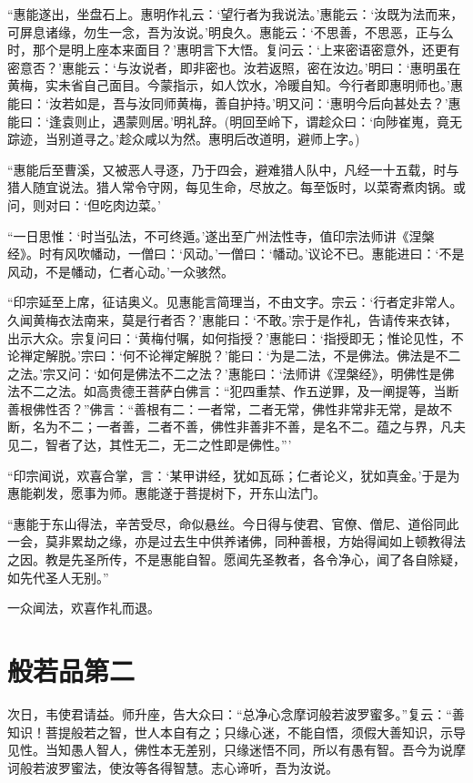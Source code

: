 \documentclass[UTF8, 11pt, oneside]{ctexart}
\begin{document}
“惠能遂出，坐盘石上。惠明作礼云：‘望行者为我说法。’惠能云：‘汝既为法而来，可屏息诸缘，勿生一念，吾为汝说。’明良久。惠能云：‘不思善，不思恶，正与么时，那个是明上座本来面目？’惠明言下大悟。复问云：‘上来密语密意外，还更有密意否？’惠能云：‘与汝说者，即非密也。汝若返照，密在汝边。’明曰：‘惠明虽在黄梅，实未省自己面目。今蒙指示，如人饮水，冷暖自知。今行者即惠明师也。’惠能曰：‘汝若如是，吾与汝同师黄梅，善自护持。’明又问：‘惠明今后向甚处去？’惠能曰：‘逢袁则止，遇蒙则居。’明礼辞。(明回至岭下，谓趁众曰：‘向陟崔嵬，竟无踪迹，当别道寻之。’趁众咸以为然。惠明后改道明，避师上字。)

“惠能后至曹溪，又被恶人寻逐，乃于四会，避难猎人队中，凡经一十五载，时与猎人随宜说法。猎人常令守网，每见生命，尽放之。每至饭时，以菜寄煮肉锅。或问，则对曰：‘但吃肉边菜。’

“一日思惟：‘时当弘法，不可终遁。’遂出至广州法性寺，值印宗法师讲《涅槃经》。时有风吹幡动，一僧曰：‘风动。’一僧曰：‘幡动。’议论不已。惠能进曰：‘不是风动，不是幡动，仁者心动。’一众骇然。

“印宗延至上席，征诘奥义。见惠能言简理当，不由文字。宗云：‘行者定非常人。久闻黄梅衣法南来，莫是行者否？’惠能曰：‘不敢。’宗于是作礼，告请传来衣钵，出示大众。宗复问曰：‘黄梅付嘱，如何指授？’惠能曰：‘指授即无；惟论见性，不论禅定解脱。’宗曰：‘何不论禅定解脱？’能曰：‘为是二法，不是佛法。佛法是不二之法。’宗又问：‘如何是佛法不二之法？’惠能曰：‘法师讲《涅槃经》，明佛性是佛法不二之法。如高贵德王菩萨白佛言：“犯四重禁、作五逆罪，及一阐提等，当断善根佛性否？”佛言：“善根有二：一者常，二者无常，佛性非常非无常，是故不断，名为不二；一者善，二者不善，佛性非善非不善，是名不二。蕴之与界，凡夫见二，智者了达，其性无二，无二之性即是佛性。”’

“印宗闻说，欢喜合掌，言：‘某甲讲经，犹如瓦砾；仁者论义，犹如真金。’于是为惠能剃发，愿事为师。惠能遂于菩提树下，开东山法门。

“惠能于东山得法，辛苦受尽，命似悬丝。今日得与使君、官僚、僧尼、道俗同此一会，莫非累劫之缘，亦是过去生中供养诸佛，同种善根，方始得闻如上顿教得法之因。教是先圣所传，不是惠能自智。愿闻先圣教者，各令净心，闻了各自除疑，如先代圣人无别。”

一众闻法，欢喜作礼而退。



\section*{般若品第二}

次日，韦使君请益。师升座，告大众曰：“总净心念摩诃般若波罗蜜多。”复云：“善知识！菩提般若之智，世人本自有之；只缘心迷，不能自悟，须假大善知识，示导见性。当知愚人智人，佛性本无差别，只缘迷悟不同，所以有愚有智。吾今为说摩诃般若波罗蜜法，使汝等各得智慧。志心谛听，吾为汝说。
\end{document}

